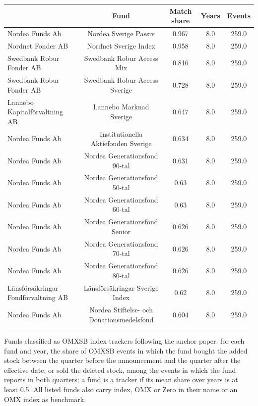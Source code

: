 \begin{threeparttable}
\begingroup
\renewcommand\cellalign{t}
\renewcommand\arraystretch{1}
\setlength{\tabcolsep}{5pt}
\begin{tabular}{@{}lcccc}
\toprule
 & Fund & Match share & Years & Events \\
\midrule
\addlinespace[1ex]
Nordea Funds Ab & Nordea Sverige Passiv & 0.967 & 8.0 & 259.0 \\
\addlinespace[0.25ex]
\addlinespace[0.25ex]
Nordnet Fonder AB & Nordnet Sverige Index & 0.958 & 8.0 & 259.0 \\
\addlinespace[0.25ex]
\addlinespace[0.25ex]
Swedbank Robur Fonder AB & Swedbank Robur Access Mix & 0.816 & 8.0 & 259.0 \\
\addlinespace[0.25ex]
\addlinespace[0.25ex]
Swedbank Robur Fonder AB & Swedbank Robur Access Sverige & 0.728 & 8.0 & 259.0 \\
\addlinespace[0.25ex]
\addlinespace[0.25ex]
Lannebo Kapitalförvaltning AB & Lannebo Marknad Sverige & 0.647 & 8.0 & 259.0 \\
\addlinespace[0.25ex]
\addlinespace[0.25ex]
Nordea Funds Ab & Institutionella Aktiefonden Sverige & 0.634 & 8.0 & 259.0 \\
\addlinespace[0.25ex]
\addlinespace[0.25ex]
Nordea Funds Ab & Nordea Generationsfond 90-tal & 0.631 & 8.0 & 259.0 \\
\addlinespace[0.25ex]
\addlinespace[0.25ex]
Nordea Funds Ab & Nordea Generationsfond 50-tal & 0.63 & 8.0 & 259.0 \\
\addlinespace[0.25ex]
\addlinespace[0.25ex]
Nordea Funds Ab & Nordea Generationsfond 60-tal & 0.63 & 8.0 & 259.0 \\
\addlinespace[0.25ex]
\addlinespace[0.25ex]
Nordea Funds Ab & Nordea Generationsfond Senior & 0.626 & 8.0 & 259.0 \\
\addlinespace[0.25ex]
\addlinespace[0.25ex]
Nordea Funds Ab & Nordea Generationsfond 70-tal & 0.626 & 8.0 & 259.0 \\
\addlinespace[0.25ex]
\addlinespace[0.25ex]
Nordea Funds Ab & Nordea Generationsfond 80-tal & 0.626 & 8.0 & 259.0 \\
\addlinespace[0.25ex]
\addlinespace[0.25ex]
Länsförsäkringar Fondförvaltning AB & Länsförsäkringar Sverige Index & 0.62 & 8.0 & 259.0 \\
\addlinespace[0.25ex]
\addlinespace[0.25ex]
Nordea Funds Ab & Nordea Stiftelse- och Donationsmedelsfond & 0.604 & 8.0 & 259.0 \\
\addlinespace[0.25ex]
\bottomrule
\end{tabular}
\endgroup
\noindent\begin{minipage}{\linewidth}\smallskip\footnotesize
Funds classified as OMXSB index trackers following the anchor paper: for each fund and year, the share of OMXSB events in which the fund bought the added stock between the quarter before the announcement and the quarter after the effective date, or sold the deleted stock, among the events in which the fund reports in both quarters; a fund is a tracker if its mean share over years is at least 0.5. All listed funds also carry index, OMX or Zero in their name or an OMX index as benchmark.\end{minipage}

\end{threeparttable}